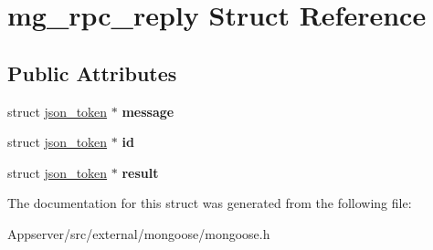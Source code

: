 \hypertarget{structmg__rpc__reply}{}\section{mg\+\_\+rpc\+\_\+reply Struct Reference}
\label{structmg__rpc__reply}
\subsection*{Public Attributes}
\begin{DoxyCompactItemize}
\item 
struct \hyperlink{structjson__token}{json\+\_\+token} $\ast$ {\bfseries message}\hypertarget{structmg__rpc__reply_a46cc6647ecba2ed3804dce0465824f3f}{}\label{structmg__rpc__reply_a46cc6647ecba2ed3804dce0465824f3f}

\item 
struct \hyperlink{structjson__token}{json\+\_\+token} $\ast$ {\bfseries id}\hypertarget{structmg__rpc__reply_ae52baf7fd69ed569d74f6737e0ba5a5f}{}\label{structmg__rpc__reply_ae52baf7fd69ed569d74f6737e0ba5a5f}

\item 
struct \hyperlink{structjson__token}{json\+\_\+token} $\ast$ {\bfseries result}\hypertarget{structmg__rpc__reply_a73991ea608b8e0f06f6b46dc49ce47d8}{}\label{structmg__rpc__reply_a73991ea608b8e0f06f6b46dc49ce47d8}

\end{DoxyCompactItemize}


The documentation for this struct was generated from the following file\+:\begin{DoxyCompactItemize}
\item 
Appserver/src/external/mongoose/mongoose.\+h\end{DoxyCompactItemize}
